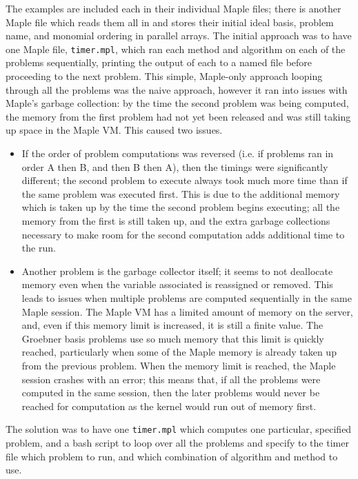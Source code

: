\documentclass[letterpaper,12pt,titlepage,oneside,final]{book}
\begin{document}
\begin{appendices}
The examples are included each in their individual Maple files; there is another Maple file which reads them all in and stores their initial ideal basis, problem name, and monomial ordering in parallel arrays.  The initial approach was to have one Maple file, \texttt{timer.mpl}, which ran each method and algorithm on each of the problems sequentially, printing the output of each to a named file before proceeding to the next problem.  This simple, Maple-only approach looping through all the problems was the naive approach, however it ran into issues with Maple's garbage collection: by the time the second problem was being computed, the memory from the first problem had not yet been released and was still taking up space in the Maple VM.  This caused two issues.
\begin{itemize}
  \item If the order of problem computations was reversed (i.e. if problems ran in order A then B, and then B then A), then the timings were significantly different; the second problem to execute always took much more time than if the same problem was executed first.  This is due to the additional memory which is taken up by the time the second problem begins executing; all the memory from the first is still taken up, and the extra garbage collections necessary to make room for the second computation adds additional time to the run.
  \item Another problem is the garbage collector itself; it seems to not deallocate memory even when the variable associated is reassigned or removed.  This leads to issues when multiple problems are computed sequentially in the same Maple session.  The Maple VM has a limited amount of memory on the server, and, even if this memory limit is increased, it is still a finite value.  The Groebner basis problems use so much memory that this limit is quickly reached, particularly when some of the Maple memory is already taken up from the previous problem.  When the memory limit is reached, the Maple session crashes with an error; this means that, if all the problems were computed in the same session, then the later problems would never be reached for computation as the kernel would run out of memory first.  
\end{itemize} 
The solution was to have one \texttt{timer.mpl} which computes one particular, specified problem, and a bash script to loop over all the problems and specify to the timer file which problem to run, and which combination of algorithm and method to use.


\end{appendices}
\end{document}
